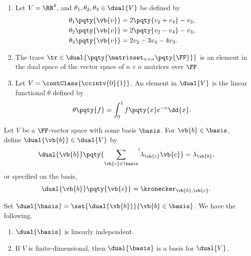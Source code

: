 \begin{example}
    \begin{enumerate}
        \item Let \(V = \RR^4\), and \(\theta_1, \theta_2, \theta_3 \in \dual{V}\) be defined by
        \begin{align*}
            \theta_1 \pqty{\vb{v}} &= 2\pqty{v_2 + v_4} - v_3, \\
            \theta_2 \pqty{\vb{v}} &= 2\pqty{v_2 - v_4} - v_3, \\
            \theta_3 \pqty{\vb{v}} &= 2 v_2 - 3 v_4 - 4 v_3.
        \end{align*}
        
        \item The trace \(\tr \in \dual{\pqty{\matrixset_{n \times n} \pqty{\FF}}}\) is an element in the dual space of the vector space of \(n \times n\) matrices over \(\FF\).
        
        \item Let \(V = \contClass{\ccintv{0}{1}}\). An element in \(\dual{V}\) is the linear functional \(\theta\) defined by
        \[
            \theta \pqty{f} = \int_0^1 f\pqty{x} e^{-x} \dd{x}.
        \]
    \end{enumerate}
\end{example}

\begin{proposition}
    \label{prop:dual-basis}%
    Let \(V\) be a \(\FF\)-vector space with some basis \(\basis\). For \(\vb{b} \in \basis\), define \(\dual{\vb{b}} \in \dual{V}\) by
    \[
        \dual{\vb{b}}\pqty{{\sum_{\vb{c} \in \basis}}' \lambda_{\vb{c}} \vb{c}} = \lambda_{\vb{b}},
    \]
    or specified on the basis,
    \[
        \dual{\vb{b}}\pqty{\vb{c}} = \kronecker_{\vb{b}, \vb{c}}.
    \]

    Set \(\dual{\basis} = \set{\dual{\vb{b}}}{\vb{b} \in \basis}\). We have the following.

    \begin{enumerate}[label=(\roman*)]
        \item \(\dual{\basis}\) is linearly independent.
        \item If \(V\) is finite-dimensional, then \(\dual{\basis}\) is a basis for \(\dual{V}\).
    \end{enumerate}
\end{proposition}

